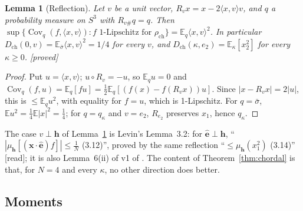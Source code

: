 \documentclass[11pt,a4paper]{article}
\newtheorem{lemma}[theorem]{Lemma}
\theoremstyle{remark}
\theoremstyle{definition}
\theoremstyle{plain}
\theoremstyle{remark}
\newcommand{\E}{\mathbb{E}}
\newcommand{\Cov}{\operatorname{Cov}}
\newcommand{\st}[1]{\textsf{[#1]}}
\newcommand{\Dch}{D_{\mathrm{ch}}}
\newcommand{\rch}{\rho_{\mathrm{ch}}}
\begin{document}
\begin{lemma}[Reflection]\label{lem:refl}
Let $v$ be a unit vector, $R_v x=x-2\langle x,v\rangle v$, and $q$ a probability measure on $S^3$ with
$R_{v\#}q=q$. Then $\sup\{\Cov_q(f,\langle x,v\rangle): f \text{ 1-Lipschitz for }\rch\}=\E_q\langle x,v\rangle^2$.
In particular $\Dch(0,v)=\E_{\bar\sigma}\langle x,v\rangle^2=1/4$ for every $v$, and
$\Dch(\kappa,e_2)=\E_\kappa[x_2^2]$ for every $\kappa\ge0$. \st{proved}
\end{lemma}
\begin{proof}
Put $u=\langle x,v\rangle$; $u\circ R_v=-u$, so $\E_qu=0$ and $\Cov_q(f,u)=\E_q[fu]=\frac12\E_q[(f(x)-f(R_vx))u]$.
Since $|x-R_vx|=2|u|$, this is $\le\E_q u^2$, with equality for $f=u$, which is 1-Lipschitz. For $q=\bar\sigma$,
$\E u^2=\frac14\E|x|^2=\frac14$; for $q=q_\kappa$ and $v=e_2$, $R_{e_2}$ preserves $x_1$, hence $q_\kappa$.
\end{proof}
The case $v\perp\mathbf h$ of Lemma~\ref{lem:refl} is Levin's Lemma~3.2: for $\hat{\mathbf e}\perp\mathbf h$,
``$|\mu_{\mathbf h}[(\mathbf x\cdot\hat{\mathbf e})f]|\leqslant\frac1N$ (3.12)'', proved by the same reflection
``$\leqslant\mu_{\mathbf h}(x_1^2)$ (3.14)'' \cite[p.~68]{Lev80} \st{read}; it is also Lemma~6(ii) of v1 of \cite{BB26}.
The content of Theorem~\ref{thm:chordal} is that, for $N=4$ and every $\kappa$, no other direction does better.

\subsection{Moments}\label{sec:chmom}
\end{document}
